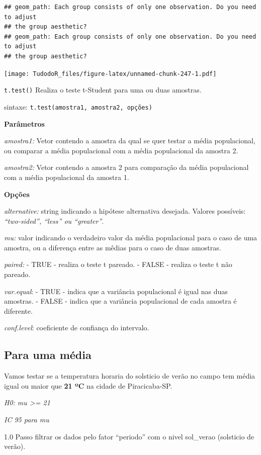 \documentclass[
]{book}
\begin{document}
\begin{verbatim}
## geom_path: Each group consists of only one observation. Do you need to adjust
## the group aesthetic?
## geom_path: Each group consists of only one observation. Do you need to adjust
## the group aesthetic?
\end{verbatim}

\texttt{[image: TudodoR\_files/figure-latex/unnamed-chunk-247-1.pdf]}

\texttt{t.test()}
Realiza o teste t-Student para uma ou duas amostras.

sintaxe:
\texttt{t.test(amostra1,\ amostra2,\ opções)}

\textbf{Parâmetros}

\emph{amostra1:} Vetor contendo a amostra da qual se quer testar a média populacional, ou comparar a média populacional com a média populacional da amostra 2.

\emph{amostra2:} Vetor contendo a amostra 2 para comparação da média populacional com a média populacional da amostra 1.

\textbf{Opções}

\emph{alternative:} string indicando a hipótese alternativa desejada.
Valores possíveis: \emph{``two-sided'', ``less'' ou ``greater''}.

\emph{mu:} valor indicando o verdadeiro valor da média populacional para o caso de uma amostra, ou a diferença entre as mêdias para o caso de duas amostras.

\emph{paired:}
- TRUE - realiza o teste t pareado.
- FALSE - realiza o teste t não pareado.

\emph{var.equal}:
- TRUE - indica que a variância populacional é igual nas duas amostras.
- FALSE - indica que a variância populacional de cada amostra é diferente.

\emph{conf.level}: coeficiente de confiança do intervalo.

\hypertarget{para-uma-muxe9dia}{%
\subsection{Para uma média}\label{para-uma-muxe9dia}}

Vamos testar se a temperatura horaria do solsticio de verão no campo tem média igual ou maior que \textbf{21 ºC} na cidade de Piracicaba-SP.

\emph{H0: mu \textgreater= 21}

\emph{IC 95 para mu}

1.0 Passo filtrar os dados pelo fator ``periodo'' com o nivel sol\_verao (solsticio de verão).
\end{document}

